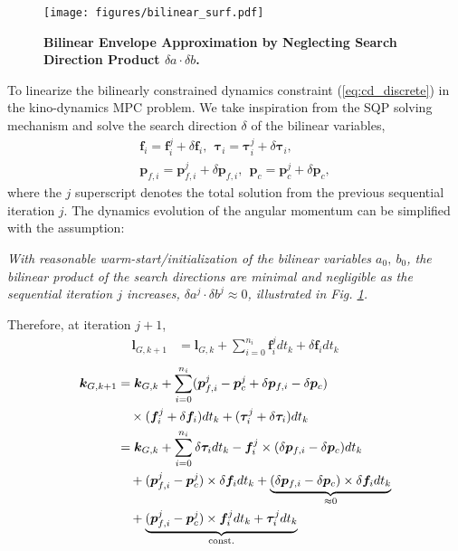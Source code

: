 \begin{figure}[!t]
\vspace{0.2cm}
    \center
    \texttt{[image: figures/bilinear\_surf.pdf]}
    \caption{{\bfseries Bilinear Envelope Approximation by Neglecting Search Direction Product $\delta a\cdot\delta b$.}}
    \label{fig:bisurf}
    \vspace{-0.2cm}
\end{figure}

To linearize the bilinearly constrained dynamics constraint (\ref{eq:cd_discrete}) in the kino-dynamics MPC problem. We take inspiration from the SQP solving mechanism and solve the search direction $\delta$ of the bilinear variables, 
\begin{align}
    \bm f_i = \bm f^j_i +  \delta \bm f_i, \:\: \bm \tau_i = \bm \tau^j_i +  \delta \bm \tau_i, \nonumber\\
    \bm p_{f,i} = \bm p^j_{f,i} +\delta \bm p_{f,i}, \:\: \bm p_{c} = \bm p^j_{c} +\delta \bm p_{c},
\end{align}
where the $j$ superscript denotes the total solution from the previous sequential iteration $j$. 
The dynamics evolution of the angular momentum can  be simplified with the assumption:
\begin{assumption}
    \textit{With reasonable warm-start/initialization of the bilinear variables $a_0,\: b_0$, the bilinear product of the search directions are minimal and negligible as the sequential iteration $j$ increases, $\delta a^j \cdot \delta b^j \approx 0$, illustrated in Fig.  \ref{fig:bisurf}.} 
    \label{assump2}
\end{assumption}

Therefore, at iteration $j+1$, 
\begin{align}
\label{eq:lG}
    \bm l_{G,k+1} & = \bm l_{G,k} + \sum_{i = 0}^{n_i}\bm f^j_i dt_k +  \delta \bm f_i dt_k
\end{align}
\begin{equation}
\allowdisplaybreaks
\begin{aligned}
    \label{eq:kG}
    \bm k_{G,k+1} & = \bm k_{G,k} + \sum_{i = 0}^{n_i}(\bm p^j_{f,i} - \bm p^j_c+\delta \bm p_{f,i}-\delta \bm p_c) \\ & \quad 
    \times (\bm f^j_i +  \delta \bm f_i)dt_k  + (\bm \tau^j_i + \delta \bm \tau_i)dt_k \\
    & = \bm k_{G,k} + \sum_{i = 0}^{n_i} \delta \bm \tau_i dt_k  -\bm f^j_i \times(\delta \bm p_{f,i}-\delta \bm p_c) dt_k \\ & \quad  
    +(\bm p^j_{f,i} - \bm p^j_c)\times \delta \bm f_i dt_k + 
    \underbrace{(\delta \bm p_{f,i}-\delta \bm p_c) \times \delta \bm f_i dt_k}_{\approx 0} \\ & \quad
     + \underbrace{(\bm p^j_{f,i} - \bm p^j_c)\times \bm f^j_i dt_k + \bm \tau^j_i dt_k}_\text{const.} 
\end{aligned}
\end{equation}


